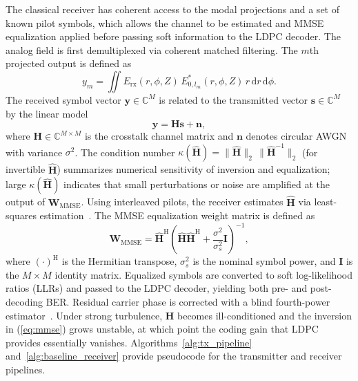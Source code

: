 \documentclass[journal]{IEEEtran}
\begin{document}
The classical receiver has coherent access to the modal projections and a set of known pilot symbols, which allows the channel to be estimated and MMSE equalization applied before passing soft information to the LDPC decoder. The analog field is first demultiplexed via coherent matched filtering. The $m$th projected output is defined as
\begin{equation}
\label{eq:mode_projection}
    y_m = \iint E_{\mathrm{rx}}(r, \phi, Z)\, E_{0, l_m}^{*}(r, \phi, Z)\, r \,\mathrm{d}r \,\mathrm{d}\phi.
\end{equation}
The received symbol vector $\mathbf{y} \in \mathbb{C}^{M}$ is related to the transmitted vector $\mathbf{s} \in \mathbb{C}^{M}$ by the linear model
\begin{equation}
\label{eq:linear_channel}
    \mathbf{y} = \mathbf{H} \mathbf{s} + \mathbf{n},
\end{equation}
where $\mathbf{H} \in \mathbb{C}^{M \times M}$ is the crosstalk channel matrix and $\mathbf{n}$ denotes circular AWGN with variance $\sigma^2$. The condition number $\kappa(\hat{\mathbf{H}}) = \|\hat{\mathbf{H}}\|_2 \,\|\hat{\mathbf{H}}^{-1}\|_2$ (for invertible $\hat{\mathbf{H}}$) summarizes numerical sensitivity of inversion and equalization; large $\kappa(\hat{\mathbf{H}})$ indicates that small perturbations or noise are amplified at the output of $\mathbf{W}_{\mathrm{MMSE}}$. Using interleaved pilots, the receiver estimates $\hat{\mathbf{H}}$ via least-squares estimation~\cite{kay1993fundamentals}. The MMSE equalization weight matrix is defined as~\cite{kay1993fundamentals}
\begin{equation}
\label{eq:mmse}
    \mathbf{W}_{\mathrm{MMSE}} = \hat{\mathbf{H}}^{\mathrm{H}} \left( \hat{\mathbf{H}} \hat{\mathbf{H}}^{\mathrm{H}} + \frac{\sigma^2}{\sigma_s^2} \mathbf{I} \right)^{-1},
\end{equation}
where $(\cdot)^{\mathrm{H}}$ is the Hermitian transpose, $\sigma_s^2$ is the nominal symbol power, and $\mathbf{I}$ is the $M \times M$ identity matrix. Equalized symbols are converted to soft log-likelihood ratios (LLRs) and passed to the LDPC decoder, yielding both pre- and post-decoding BER. Residual carrier phase is corrected with a blind fourth-power estimator~\cite{viterbi1983nonlinear}. Under strong turbulence, $\mathbf{H}$ becomes ill-conditioned and the inversion in (\ref{eq:mmse}) grows unstable, at which point the coding gain that LDPC provides essentially vanishes. Algorithms~\ref{alg:tx_pipeline} and~\ref{alg:baseline_receiver} provide pseudocode for the transmitter and receiver pipelines.
\end{document}
